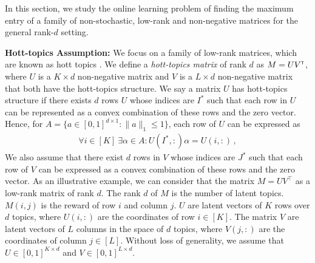 
In this section, we study the online learning problem of finding the maximum entry of a family of non-stochastic, low-rank and non-negative matrices for the general rank-$d$ setting.  

\textbf{Hott-topics Assumption:} We focus on a family of low-rank matrices, which are known as hott topics \citep{recht2012factoring}. We define a \emph{hott-topics matrix} of rank $d$ as $M = U V^\mathsf{\scriptscriptstyle T}$, where $U$ is a $K \times d$ non-negative matrix and $V$ is a $L \times d$ non-negative matrix that both have the hott-topics structure. We say a matrix  $U$  has hott-topics structure if  there exists $d$ rows  $U$ whose indices are $I^\ast$ such that each row in $U$ can be represented as a convex combination of these rows  and the zero vector. Hence, for $A = \{a \in [0, 1]^{d \times 1}: \|a\|_1 \leq 1\}$, each row of $U$ can be expressed as
\begin{align}
  \forall i \in [K] \ \exists \alpha \in A: U(I^\ast, :) \alpha = U(i, :)\,,
  \label{eq:hott topics1}
\end{align}
We also assume that there exist $d$ rows in $V$ whose indices are $J^\ast$ such that each row of $V$ can be expressed as a convex combination of these rows  and the zero vector.
As an illustrative example, we can consider that the matrix $M = UV^\intercal$ as a low-rank matrix of rank $d$. The rank $d$ of $M$ is the number of latent topics. $M(i, j)$ is the reward of row $i$ and column $j$. $U$ are latent vectors of $K$ rows over $d$ topics, where $U(i, :)$ are the coordinates of row $i \in [K]$. The matrix $V$ are latent vectors of $L$ columns in the space of $d$ topics, where $V(j, :)$ are the coordinates of column $j \in [L]$. 
Without loss of generality, we assume that $U \in [0, 1]^{K \times d}$ and $V \in [0, 1]^{L \times d}$.

